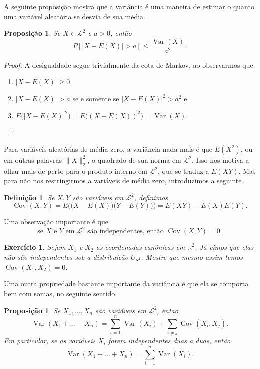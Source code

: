 \documentclass[reqno, draft]{book}
\newcommand*\1{\mathds{1}}
\newtheorem{proposition}[theorem]{Proposição}
\newtheorem{definition}[theorem]{Definição}
\newtheorem{exercise}[example]{Exercício}
\DeclareMathOperator{\Cov}{Cov}
\DeclareMathOperator{\Var}{Var}
\begin{document}
A seguinte proposição mostra que a variância é uma maneira de estimar o quanto uma variável aleatória se desvia de sua média.
\begin{proposition}
  Se $X \in \mathcal{L}^2$ e $a > 0$, então
  \begin{equation}
    P [ |X - E(X)| > a] \leq \frac{\Var(X)}{a^2}.
  \end{equation}
\end{proposition}

\begin{proof}
  A desigualdade segue trivialmente da cota de Markov, ao observarmos que
  \begin{enumerate}[\quad a)]
  \item $|X - E(X)| \geq 0$,
  \item $|X - E(X)| > a$ se e somente se $|X - E(X)|^2 > a^2$ e
  \item $E\big(|X - E(X)|^2\big) = E\big((X - E(X))^2\big) = \Var(X)$.
  \end{enumerate}
\end{proof}

Para variáveis aleatórias de média zero, a variância nada mais é que $E(X^2)$, ou em outras palavras $\lVert X \rVert^2_2$, o quadrado de sua norma em $\mathcal{L}^2$.
Isso nos motiva a olhar mais de perto para o produto interno em $\mathcal{L}^2$, que se traduz a $E(XY)$.
Mas para não nos restringirmos a variáveis de média zero, introduzimos a seguinte

\begin{definition}
  Se $X, Y$ são variáveis em $\mathcal{L}^2$, definimos
  \begin{equation}
    \Cov(X,Y) = E\Big( \big(X - E(X)\big) \big(Y - E(Y)\big) \Big) = E(XY) - E(X)E(Y).
  \end{equation}
\end{definition}

Uma observação importante é que
\begin{equation}
  \text{se $X$ e $Y$ em $\mathcal{L}^2$ são independentes, então $\Cov(X,Y) = 0$.}
\end{equation}

\begin{exercise}
  Sejam $X_1$ e $X_2$ as coordenadas canônicas em $\mathbb{R}^2$.
  Já vimos que elas não são independentes sob a distribuição $U_{S^1}$.
  Mostre que mesmo assim temos $\Cov(X_1, X_2) = 0$.
\end{exercise}

Uma outra propriedade bastante importante da variância é que ela se comporta bem com somas, no seguinte sentido
\begin{proposition}
  Se $X_1, \dots, X_n$ são variáveis em $\mathcal{L}^2$, então
  \begin{equation}
    \Var(X_1 + \dots + X_n) = \sum_{i=1}^n \Var(X_i) + \sum_{i \neq j} \Cov(X_i, X_j).
  \end{equation}
  Em particular, se as variáveis $X_i$ forem independentes duas a duas, então
  \begin{equation}
    \Var(X_1 + \dots + X_n) = \sum_{i=1}^n \Var(X_i).
  \end{equation}
\end{proposition}
\end{document}
